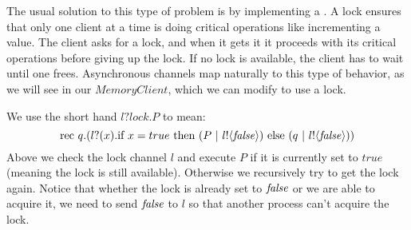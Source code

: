 The usual solution to this type of problem is by implementing a .  
A lock ensures that only one client at a time is doing critical operations like incrementing a value.  
The client asks for a lock, and when it gets it it proceeds with its critical operations before giving up the lock.  
If no lock is available, the client has to wait until one frees.  
Asynchronous channels map naturally to this type of behavior, as we will see in our $MemoryClient$, which we can modify to use a lock.  

We use the short hand $l?lock.P$ to mean:
\[
	\text{rec }{q}.({l}?({x}). \text{if } {x=true}\text{ then } (P\ |\  {l}!\langle{\mbox{\emph{false}}}\rangle)\text{ else }(q \ |\  {l}!\langle{\mbox{\emph{false}}}\rangle))
\]
Above we check the lock channel $l$ and execute $P$ if it is currently set to $true$ (meaning the lock is still available). 
Otherwise we recursively try to get the lock again.
Notice that whether the lock is already set to $\mbox{\emph{false}}$ or we are able to acquire it, we need to send $\mbox{\emph{false}}$ to $l$ so that another process can't acquire the lock.

